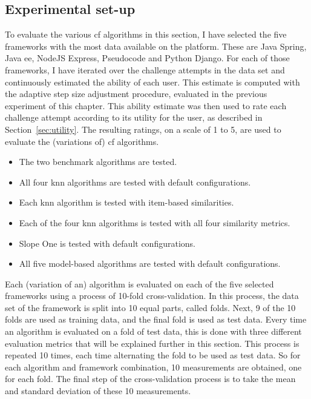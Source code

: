 \subsection{Experimental set-up}
To evaluate the various \gls{cf} algorithms in this section, I have selected the five frameworks with the most data available on the platform.
These are Java Spring, Java \gls{ee}, NodeJS Express, Pseudocode and Python Django.
For each of those frameworks, I have iterated over the challenge attempts in the data set and continuously estimated the ability of each user.
This estimate is computed with the adaptive step size adjustment procedure, evaluated in the previous experiment of this chapter.
This ability estimate was then used to rate each challenge attempt according to its utility for the user, as described in Section~\ref{sec:utility}.
The resulting ratings, on a scale of 1 to 5, are used to evaluate the (variations of) \gls{cf} algorithms.

\begin{itemize}
    \item The two benchmark algorithms are tested.
    \item All four \gls{knn} algorithms are tested with default configurations.
    \item Each \gls{knn} algorithm is tested with item-based similarities.
    \item Each of the four \gls{knn} algorithms is tested with all four similarity metrics.
    \item Slope One is tested with default configurations.
    \item All five model-based algorithms are tested with default configurations.
\end{itemize}

Each (variation of an) algorithm is evaluated on each of the five selected frameworks using a process of 10-fold cross-validation.
In this process, the data set of the framework is split into 10 equal parts, called folds.
Next, 9 of the 10 folds are used as training data, and the final fold is used as test data.
Every time an algorithm is evaluated on a fold of test data, this is done with three different evaluation metrics that will be explained further in this section.
This process is repeated 10 times, each time alternating the fold to be used as test data.
So for each algorithm and framework combination, 10 measurements are obtained, one for each fold.
The final step of the cross-validation process is to take the mean and standard deviation of these 10 measurements.

